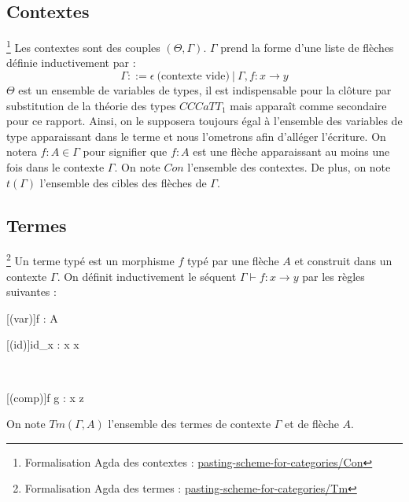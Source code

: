 \documentclass[conference]{IEEEtran}
\begin{document}
	\subsection{Contextes}
	\footnote{Formalisation Agda des contextes : \href{https://github.com/ehouget/L3-ENS-Internship/tree/main/pasting-scheme-for-categories/Con}{pasting-scheme-for-categories/Con}}
	Les contextes sont des couples $(\Theta, \Gamma)$. $\Gamma$ prend la forme d'une liste de flèches définie inductivement par : $$ \Gamma ::= \epsilon \ \text{(contexte vide)} \ |\ \Gamma , f : x \rightarrow y$$
	$\Theta$ est un ensemble de variables de types, il est indispensable pour la clôture par substitution de la théorie des types $CCCaTT_1$ mais apparaît comme secondaire pour ce rapport. Ainsi, on le supposera toujours égal à l'ensemble des variables de type apparaissant dans le terme et nous l'ometrons afin d'alléger l'écriture.
	On notera $f : A \in \Gamma$ pour signifier que $f : A$ est une flèche apparaissant au moins une fois dans le contexte $\Gamma$. On note $Con$ l'ensemble des contextes. De plus, on note $t(\Gamma)$ l'ensemble des cibles des flèches de $\Gamma$.
	
	\subsection{Termes} 
	\footnote{Formalisation Agda des termes : \href{https://github.com/ehouget/L3-ENS-Internship/tree/main/pasting-scheme-for-cartesian-categories/Tm}{pasting-scheme-for-categories/Tm}}
	Un terme typé est un morphisme $f$ typé par une flèche $A$ et construit dans un contexte $\Gamma$. On définit inductivement le séquent $\Gamma \vdash f : x \rightarrow y$ par les règles suivantes :
	\begin{center}
		\begin{prooftree}
			[(var)]{\Gamma \vdash f : A}
		\end{prooftree}
		\hspace{10pt}
		\begin{prooftree}
			[(id)]{\Gamma \vdash id_x : x \rightarrow x}
		\end{prooftree} \\
		\vspace{20pt}
		\begin{prooftree}
			\hypo[]{\Gamma \vdash f : x \rightarrow y}
			\hypo[]{\Gamma \vdash g : y \rightarrow z}
			[(comp)]{\Gamma \vdash f \cdot g : x \rightarrow z}
		\end{prooftree}
	\end{center}
	On note $Tm(\Gamma, A)$ l'ensemble des termes de contexte $\Gamma$ et de flèche $A$.
	
\end{document}
